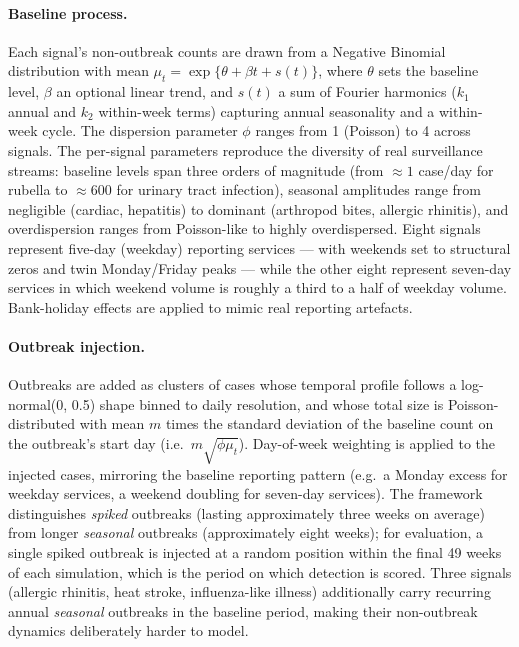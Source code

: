 \documentclass[11pt]{article}
\begin{document}
\paragraph{Baseline process.} Each signal's non-outbreak counts are drawn from a Negative Binomial distribution with mean $\mu_t = \exp\{\theta + \beta t + s(t)\}$, where $\theta$ sets the baseline level, $\beta$ an optional linear trend, and $s(t)$ a sum of Fourier harmonics ($k_1$ annual and $k_2$ within-week terms) capturing annual seasonality and a within-week cycle. The dispersion parameter $\phi$ ranges from 1 (Poisson) to 4 across signals. The per-signal parameters reproduce the diversity of real surveillance streams: baseline levels span three orders of magnitude (from $\approx 1$ case/day for rubella to $\approx 600$ for urinary tract infection), seasonal amplitudes range from negligible (cardiac, hepatitis) to dominant (arthropod bites, allergic rhinitis), and overdispersion ranges from Poisson-like to highly overdispersed. Eight signals represent five-day (weekday) reporting services --- with weekends set to structural zeros and twin Monday/Friday peaks --- while the other eight represent seven-day services in which weekend volume is roughly a third to a half of weekday volume. Bank-holiday effects are applied to mimic real reporting artefacts.

\paragraph{Outbreak injection.} Outbreaks are added as clusters of cases whose temporal profile follows a log-normal(0, 0.5) shape binned to daily resolution, and whose total size is Poisson-distributed with mean $m$ times the standard deviation of the baseline count on the outbreak's start day (i.e.\ $m\sqrt{\phi\mu_t}$). Day-of-week weighting is applied to the injected cases, mirroring the baseline reporting pattern (e.g.\ a Monday excess for weekday services, a weekend doubling for seven-day services). The framework distinguishes \textit{spiked} outbreaks (lasting approximately three weeks on average) from longer \textit{seasonal} outbreaks (approximately eight weeks); for evaluation, a single spiked outbreak is injected at a random position within the final 49 weeks of each simulation, which is the period on which detection is scored. Three signals (allergic rhinitis, heat stroke, influenza-like illness) additionally carry recurring annual \textit{seasonal} outbreaks in the baseline period, making their non-outbreak dynamics deliberately harder to model.
\end{document}
